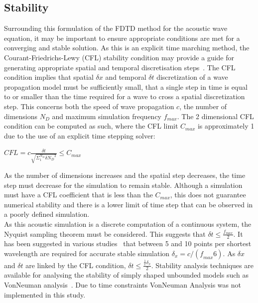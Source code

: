 \subsection{Stability}
Surrounding this formulation of the FDTD method for the acoustic wave equation, it may be important to ensure appropriate conditions are met for a converging and stable solution. As this is an explicit time marching method, the Courant-Friedrichs-Lewy (CFL) stability condition may provide a guide for generating appropriate spatial and temporal discretisation steps~\cite{Sakuma2014,Schneider2015,Angus2010,Bilbao2009,Hill2012}. The CFL condition implies that spatial $\delta x$ and temporal $\delta t$ discretization of a wave propagation model must be sufficiently small, that a single step in time is equal to or smaller than the time required for a wave to cross a spatial discretization step. This concerns both the speed of wave propagation $c$, the number of dimensions $N_D$ and maximum simulation frequency $f_{max}$. The 2 dimensional CFL condition can be computed as such, where the CFL limit $C_{max}$ is approximately 1 due to the use of an explicit time stepping solver:\\
\begin{center}
$ CFL = c \frac{\delta t}{\sqrt{\Sigma_{1}^{N_D} \delta {N_{D}}^2}} \leq C_{max}$\\
\end{center}
As the number of dimensions increases and the spatial step decreases, the time step must decrease for the simulation to remain stable. Although a simulation must have a CFL coefficient that is less than the $C_{max}$, this does not guarantee numerical stability and there is a lower limit of time step that can be observed in a poorly defined simulation.\\
As this acoustic simulation is a discrete computation of a continuous system, the Nyquist sampling theorem must be considered. This suggests that $\delta t \leq \frac{f_{max}}{2}$. It has been suggested in various studies~\cite{Hill2012,VanMourik2014} that between 5 and 10 points per shortest wavelength are required for accurate stable simulation $\delta_x = c / (\textit{f}_{max} 6)$. As $\delta x$ and $\delta t$ are linked by the CFL condition, $\delta t \leq \frac{\frac{1}{c} \delta_x}{2}$. Stability analysis techniques are available for analysing the stability of simply shaped unbounded models such as VonNeuman analysis~\cite{Bilbao2009,Hamilton2013a}. Due to time constraints VonNeuman Analysis was not implemented in this study.

